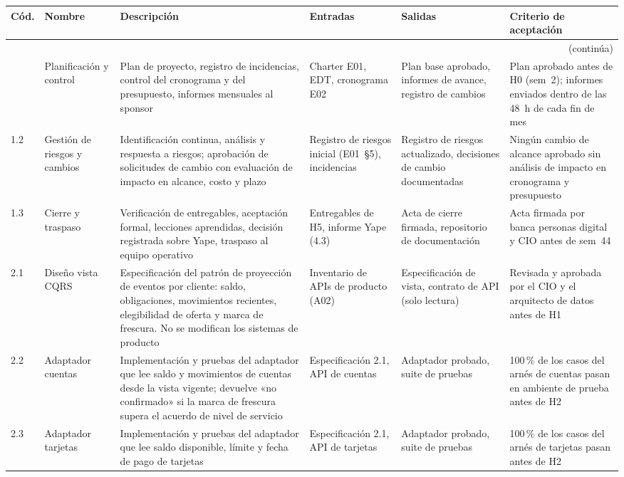 \documentclass[11pt]{article}
\begin{document}
\begin{longtable}{@{}p{0.7cm} p{2.1cm} p{3.3cm} p{2.3cm} p{2.3cm} p{2.9cm}@{}}
\toprule
\textbf{Cód.} & \textbf{Nombre} & \textbf{Descripción} & \textbf{Entradas} & \textbf{Salidas} & \textbf{Criterio de aceptación} \\
\midrule
\endhead
\midrule\multicolumn{6}{r}{\small(continúa)}\\
\endfoot
\bottomrule
\endlastfoot
1.1 & Planificación y control & Plan de proyecto, registro de incidencias, control del cronograma y del presupuesto, informes mensuales al sponsor & Charter E01, EDT, cronograma E02 & Plan base aprobado, informes de avance, registro de cambios & Plan aprobado antes de H0 (sem~2); informes enviados dentro de las 48~h de cada fin de mes \\[0.3em]
1.2 & Gestión de riesgos y cambios & Identificación continua, análisis y respuesta a riesgos; aprobación de solicitudes de cambio con evaluación de impacto en alcance, costo y plazo & Registro de riesgos inicial (E01~§5), incidencias & Registro de riesgos actualizado, decisiones de cambio documentadas & Ningún cambio de alcance aprobado sin análisis de impacto en cronograma y presupuesto \\[0.3em]
1.3 & Cierre y traspaso & Verificación de entregables, aceptación formal, lecciones aprendidas, decisión registrada sobre Yape, traspaso al equipo operativo & Entregables de H5, informe Yape (4.3) & Acta de cierre firmada, repositorio de documentación & Acta firmada por banca personas digital y CIO antes de sem~44 \\[0.5em]
\midrule
2.1 & Diseño vista CQRS & Especificación del patrón de proyección de eventos por cliente: saldo, obligaciones, movimientos recientes, elegibilidad de oferta y marca de frescura. No se modifican los sistemas de producto & Inventario de APIs de producto (A02) & Especificación de vista, contrato de API (solo lectura) & Revisada y aprobada por el CIO y el arquitecto de datos antes de H1 \\[0.3em]
2.2 & Adaptador cuentas & Implementación y pruebas del adaptador que lee saldo y movimientos de cuentas desde la vista vigente; devuelve «no confirmado» si la marca de frescura supera el acuerdo de nivel de servicio & Especificación 2.1, API de cuentas & Adaptador probado, suite de pruebas & 100\,\% de los casos del arnés de cuentas pasan en ambiente de prueba antes de H2 \\[0.3em]
2.3 & Adaptador tarjetas & Implementación y pruebas del adaptador que lee saldo disponible, límite y fecha de pago de tarjetas & Especificación 2.1, API de tarjetas & Adaptador probado, suite de pruebas & 100\,\% de los casos del arnés de tarjetas pasan antes de H2 \\[0.3em]

\end{longtable}
\end{document}

